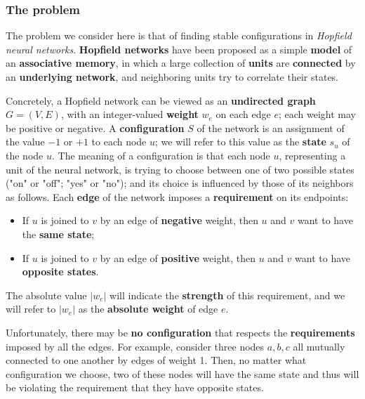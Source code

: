 \subsubsection{The problem}
The problem we consider here is that of finding stable configurations in \textit{Hopfield neural networks}. \textbf{Hopfield networks} have been proposed as a simple \textbf{model} of an \textbf{associative memory}, in which a large collection of \textbf{units} are \textbf{connected} by an \textbf{underlying network}, and neighboring units try to correlate their states. 

Concretely, a Hopfield network can be viewed as an \textbf{undirected graph} $G = (V, E)$, with an integer-valued \textbf{weight} $w_e$ on each edge $e$; each weight may be positive or negative. A \textbf{configuration} $S$ of the network is an assignment of the value $-1$ or $+1$ to each node $u$; we will refer to this value as the \textbf{state} $s_u$ of the node $u$. The meaning of a configuration is that each node $u$, representing a unit of the neural network, is trying to choose between one of two possible states ("on" or "off"; "yes" or "no"); and its choice is influenced by those of its neighbors as follows. Each \textbf{edge} of the network imposes a \textbf{requirement} on its endpoints: 

\begin{itemize}
    \item If $u$ is joined to $v$ by an edge of \textbf{negative} weight, then $u$ and $v$ want to have the \textbf{same state};
    \item If $u$ is joined to $v$ by an edge of \textbf{positive} weight, then $u$ and $v$ want to have \textbf{opposite states}.
\end{itemize}

The absolute value $|w_e|$ will indicate the \textbf{strength} of this requirement, and we will refer to $|w_e|$ as the \textbf{absolute weight} of edge $e$.

Unfortunately, there may be \textbf{no configuration} that respects the \textbf{requirements} imposed by all the edges. For example, consider three nodes $a, b, c$ all mutually connected to one another by edges of weight 1. Then, no matter what configuration we choose, two of these nodes will have the same state and thus will be violating the requirement that they have opposite states.


